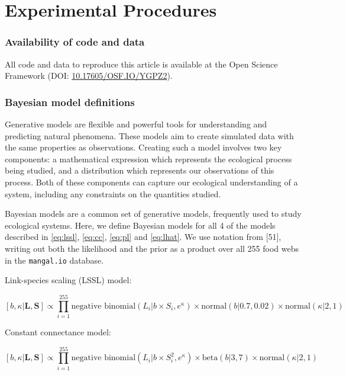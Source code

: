 \documentclass[12pt]{article}
\begin{document}
\hypertarget{experimental-procedures}{%
\section{Experimental Procedures}\label{experimental-procedures}}

\hypertarget{availability-of-code-and-data}{%
\subsubsection{Availability of code and
data}\label{availability-of-code-and-data}}

All code and data to reproduce this article is available at the Open
Science Framework (DOI:
\href{https://doi.org/10.17605/OSF.IO/YGPZ2}{10.17605/OSF.IO/YGPZ2}).

\hypertarget{bayesian-model-definitions}{%
\subsubsection{Bayesian model
definitions}\label{bayesian-model-definitions}}

Generative models are flexible and powerful tools for understanding and
predicting natural phenomena. These models aim to create simulated data
with the same properties as observations. Creating such a model involves
two key components: a mathematical expression which represents the
ecological process being studied, and a distribution which represents
our observations of this process. Both of these components can capture
our ecological understanding of a system, including any constraints on
the quantities studied.

Bayesian models are a common set of generative models, frequently used
to study ecological systems. Here, we define Bayesian models for all 4
of the models described in \cref{eq:lssl}, \cref{eq:cc}, \cref{eq:pl}
and \cref{eq:lhat}. We use notation from {[}51{]}, writing out both the
likelihood and the prior as a product over all 255 food webs in the
\texttt{mangal.io} database.

Link-species scaling (LSSL) model:

\[
[b, \kappa | \textbf{L}, \textbf{S}] \propto \prod_{i = 1}^{255} \text{negative binomial}(L_i | b \times S_i, e^{\kappa}) \times \text{normal}(b|0.7, 0.02) \times \text{normal}(\kappa|2, 1)
\]

Constant connectance model:

\[
[b, \kappa | \textbf{L}, \textbf{S}] \propto \prod_{i = 1}^{255} \text{negative binomial}(L_i | b \times S_i^2, e^{\kappa}) \times \text{beta}(b|3, 7) \times \text{normal}(\kappa|2, 1)
\]
\end{document}
